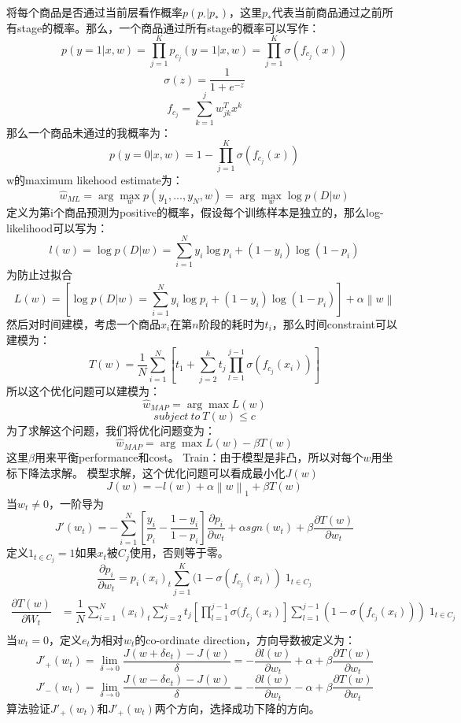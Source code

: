 将每个商品是否通过当前层看作概率$p(p_{'}|p_*)$，这里$p_*$代表当前商品通过之前所有stage的概率。那么，一个商品通过所有stage的概率可以写作：
$$p(y=1|x,w)=\prod\limits^K_{j=1}p_{c_j}(y=1|x,w)=\prod^K_{j=1}\sigma(f_{c_j}(x))$$
$$\sigma(z)=\dfrac{1}{1+e^{-z}}$$
$$f_{c_j}=\sum\limits^j_{k=1}w^T_{jk}x^k$$
那么一个商品未通过的我概率为：
$$p(y=0|x,w)=1-\prod\limits^K_{j=1}\sigma(f_{c_j}(x))$$
w的maximum likehood estimate为：
$$\hat w_{ML}=\mathop{\arg}\mathop{\max}\limits_wp(y_1,...,y_N,w)=\mathop{\arg}\mathop{\max}_w\mathop{\log}p(D|w)$$
定义为第i个商品预测为positive的概率，假设每个训练样本是独立的，那么log-likelihood可以写为：
$$l(w)=\mathop{\log}p(D|w)=\sum_{i=1}^Ny_i\mathop{\log}p_i+(1-y_i)\mathop{\log}(1-p_i)$$
为防止过拟合
$$L(w)=[\mathop{\log}p(D|w)=\sum_{i=1}^Ny_i\mathop{\log}p_i+(1-y_i)\mathop{\log}(1-p_i)]+\alpha\left\|w\right\|$$
然后对时间建模，考虑一个商品$x_i$在第$n$阶段的耗时为$t_i$，那么时间constraint可以建模为：
$$T(w)=\dfrac{1}{N}\sum_{i=1}^N[t_1+\sum_{j=2}^kt_j\prod\limits_{l=1}^{j-1}\sigma(f_{c_j}(x_i))]$$
所以这个优化问题可以建模为：
$$\hat w_{MAP}=\mathop{\arg}\mathop{\max}L(w)$$
$$subject\ to\ T(w){\le}c$$
为了求解这个问题，我们将优化问题变为：
$$\hat w_{MAP}=\mathop{\arg}\mathop{\max}L(w)-{\beta}T(w)$$
这里${\beta}$用来平衡performance和cost。
Train：由于模型是非凸，所以对每个$w$用坐标下降法求解。
模型求解，这个优化问题可以看成最小化$J(w)$
$$J(w)=-l(w)+\alpha\left\|w\right\|_1+{\beta}T(w)$$
当$w_t\ne0$，一阶导为
$$J'(w_t)=-\sum_{i=1}^N[\dfrac{y_i}{p_i}-\dfrac{1-y_i}{1-p_i}]\dfrac{{\partial}p_i}{{\partial}w_t}+{\alpha}sgn(w_t)+\beta\dfrac{{\partial}T(w)}{{\partial}w_t}$$
定义$1_{t{\in}C_j}=1$如果$x_t$被$C_j$使用，否则等于零。
$$\dfrac{{\partial}p_i}{{\partial}w_t}=p_i(x_i)_t\sum_{j=1}^K(1-\sigma(f_{c_j}(x_i))\;1_{t{\in}C_j}$$
$$
\begin{align}
\dfrac{{\partial}T(w)}{{\partial}W_t}&=\dfrac{1}{N}\sum_{i=1}^N(x_i)_t\sum_{j=2}^kt_j[\prod_{l=1}^{j-1}\sigma(f_{c_j}(x_i)]\sum_{l=1}^{j-1}(1-\sigma(f_{c_j}(x_i)))\;1_{t{\in}C_j}\nonumber\\
\end{align}
$$
当$w_t=0$，定义$e_t$为相对$w_t$的co-ordinate direction，方向导数被定义为：
$$J'_+(w_t)=\mathop{\lim}_{{\delta}\to0}\dfrac{J(w+{\delta}e_t)-J(w)}{\delta}=-\dfrac{{\partial}l(w)}{{\partial}w_t}+{\alpha}+{\beta}\dfrac{{\partial}T(w)}{{\partial}w_t}$$
$$J'_-(w_t)=\mathop{\lim}_{{\delta}\to0}\dfrac{J(w-{\delta}e_t)-J(w)}{\delta}=-\dfrac{{\partial}l(w)}{{\partial}w_t}-{\alpha}+{\beta}\dfrac{{\partial}T(w)}{{\partial}w_t}$$
算法验证$J'_+(w_t)$和$J'_+(w_t)$两个方向，选择成功下降的方向。



